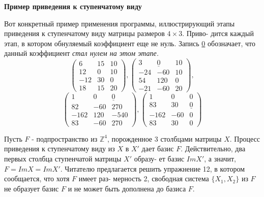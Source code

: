 \documentclass{mai_book}
\begin{document}
	\noindent
	{\bf Пример приведения к ступенчатому виду}
	
	Вот конкретный пример применения программы, иллюстрирующий\linebreak
	этапы приведения к ступенчатому виду матрицы размеров $4\times 3$. Приво-\linebreak
	дится каждый этап, в котором обнуляемый коэффициент еще не нуль.\linebreak
	Запись \underline{0} обозначает, что данный коэффициент {\it стал нулем на этом\linebreak
	этапе.}
	$$\begin{pmatrix} 6 & 15 & 10 \\ 12 & 0 & 10 \\ -12 & 30 & 0 \\ 18 & 15 & 20\end{pmatrix}, \begin{pmatrix} 3 & \underline{0} & 10 \\ -24 & -60 & 10 \\ 54 & 120 & 0 \\ -21 & -60 & 20\end{pmatrix},$$
	$$\begin{pmatrix} 1 & 0 & \underline{0} \\ 82 & -60 & 270 \\ -162 & 120 & -540 \\ 83 & -60 & 270\end{pmatrix}, \begin{pmatrix} 1 & 0 & 0 \\ 83 & 30 & \underline{0} \\ -162 & -60 & 0 \\ 83 & 30 & 0\end{pmatrix}$$
	
	Пусть $F$ - подпространство из ${\mathbb Z}^4$, порожденное 3 столбцами матрицы\linebreak
	$X$. Процесс приведения к ступенчатому виду из $X$ в $X'$ дает базис $F$.\linebreak
	Действительно, два первых столбца ступенчатой матрицы $X'$ образу-\linebreak
	ет базис $ImX'$, а значит, $F = ImX = ImX'$. Читателю предлагается\linebreak
	решить упражнение 12, в котором сообщается, что хотя $F$ имеет раз-\linebreak
	мерность 2, свободная система $\{X_1, X_2\}$ из $F$ не образует базис $F$ и не\linebreak
	может быть дополнена до базиса $F$.
	
\end{document}
